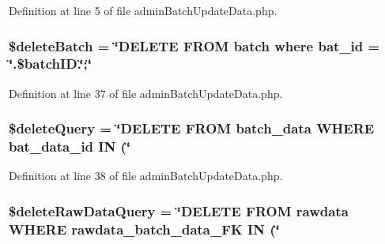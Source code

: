 Definition at line 5 of file admin\-Batch\-Update\-Data.\-php.

\hypertarget{admin_batch_update_data_8php_a402e013ee8591bfd08a5a09cb35c3cc8}{
\subsubsection[{\$delete\-Batch}]{\setlength{\rightskip}{0pt plus 5cm}\$delete\-Batch = \char`\"{}D\-E\-L\-E\-T\-E F\-R\-O\-M batch where bat\-\_\-id = \char`\"{}.\$batch\-I\-D.\char`\"{};\char`\"{}}}\label{admin_batch_update_data_8php_a402e013ee8591bfd08a5a09cb35c3cc8}


Definition at line 37 of file admin\-Batch\-Update\-Data.\-php.

\hypertarget{admin_batch_update_data_8php_ad08dc0a05af9c3e0730669485af92e41}{
\subsubsection[{\$delete\-Query}]{\setlength{\rightskip}{0pt plus 5cm}\$delete\-Query = \char`\"{}D\-E\-L\-E\-T\-E F\-R\-O\-M batch\-\_\-data W\-H\-E\-R\-E bat\-\_\-data\-\_\-id I\-N (\char`\"{}}}\label{admin_batch_update_data_8php_ad08dc0a05af9c3e0730669485af92e41}


Definition at line 38 of file admin\-Batch\-Update\-Data.\-php.

\hypertarget{admin_batch_update_data_8php_ae5af6d755eaaf6ecdff2af55a8b6419f}{
\subsubsection[{\$delete\-Raw\-Data\-Query}]{\setlength{\rightskip}{0pt plus 5cm}\$delete\-Raw\-Data\-Query = \char`\"{}D\-E\-L\-E\-T\-E F\-R\-O\-M rawdata W\-H\-E\-R\-E rawdata\-\_\-batch\-\_\-data\-\_\-\-F\-K I\-N (\char`\"{}}}\label{admin_batch_update_data_8php_ae5af6d755eaaf6ecdff2af55a8b6419f}


